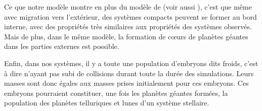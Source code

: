 Ce que notre modèle montre en plus du modèle de \cite{terquem2007migration} (voir aussi \cite{ogihara2007accretion,
cresswell2008three}), c'est que même avec migration vers l'extérieur, des systèmes compacts peuvent se former au bord interne,
avec des propriétés très similaires aux propriétés des systèmes observés. Mais de plus, dans le même modèle, la formation de
cœurs de planètes géantes dans les parties externes est possible. 

\bigskip

Enfin, dans nos systèmes, il y a toute une population d'embryons dits froids, c'est à dire n'ayant pas subi de collisions durant toute la durée des simulations. Leurs masses sont donc égales aux masses prises initialement pour ces embryons. Ces embryons pourraient constituer, une fois les planètes géantes formées, la population des planètes telluriques et lunes d'un système stellaire. 
